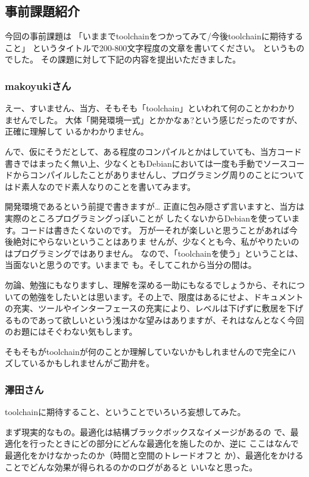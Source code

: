 \documentclass[mingoth]{jsarticle}
\begin{document}
\subsection{事前課題紹介}

今回の事前課題は
「いままでtoolchainをつかってみて/今後toolchainに期待すること」
というタイトルで200-800文字程度の文章を書いてください。
というものでした。
その課題に対して下記の内容を提出いただきました。

\subsubsection{makoyukiさん}

えー、すいません、当方、そもそも「toolchain」といわれて何のことかわかり
ませんでした。
大体「開発環境一式」とかかなぁ?という感じだったのですが、正確に理解して
いるかわかりません。

んで、仮にそうだとして、ある程度のコンパイルとかはしていても、当方コード
書きではまったく無い上、少なくともDebianにおいては一度も手動でソースコー
ドからコンパイルしたことがありませんし、プログラミング周りのことについて
はド素人なのでド素人なりのことを書いてみます。

開発環境であるという前提で書きますが…
正直に包み隠さず言いますと、当方は実際のところプログラミングっぽいことが
したくないからDebianを使っています。コードは書きたくないのです。
万が一それが楽しいと思うことがあれば今後絶対にやらないということはありま
せんが、少なくとも今、私がやりたいのはプログラミングではありません。
なので、「toolchainを使う」ということは、当面ないと思うのです。いままで
も。そしてこれから当分の間は。

勿論、勉強にもなりますし、理解を深める一助にもなるでしょうから、それにつ
いての勉強をしたいとは思います。その上で、限度はあるにせよ、ドキュメント
の充実、ツールやインターフェースの充実により、レベルは下げずに敷居を下げ
るものであって欲しいという浅はかな望みはありますが、それはなんとなく今回
のお題にはそぐわない気もします。

そもそもがtoolchainが何のことか理解していないかもしれませんので完全にハ
ズしているかもしれませんがご勘弁を。


\subsubsection{澤田さん}

toolchainに期待すること、ということでいろいろ妄想してみた。

まず現実的なもの。最適化は結構ブラックボックスなイメージがあるの 
で、最適化を行ったときにどの部分にどんな最適化を施したのか、逆に 
ここはなんで最適化をかけなかったのか（時間と空間のトレードオフと 
か）、最適化をかけることでどんな効果が得られるのかのログがあると 
いいなと思った。
\end{document}
